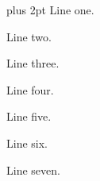    
\hsize=200pt \vsize=50pt \maxdepth=2pt \topskip=10pt \baselineskip=12pt
\parskip=0pt plus 2pt \parindent=0pt
\def\ten{\relax\relax\relax\relax\relax\relax\relax\relax\relax\relax}
\def\many{\ten\ten\ten\ten\ten\ten\ten\ten}
Line one.\par
Line two.\par
Line three.\par
Line four.\par
Line five.\par
\many
Line six.\par
Line seven.\par
\bye

